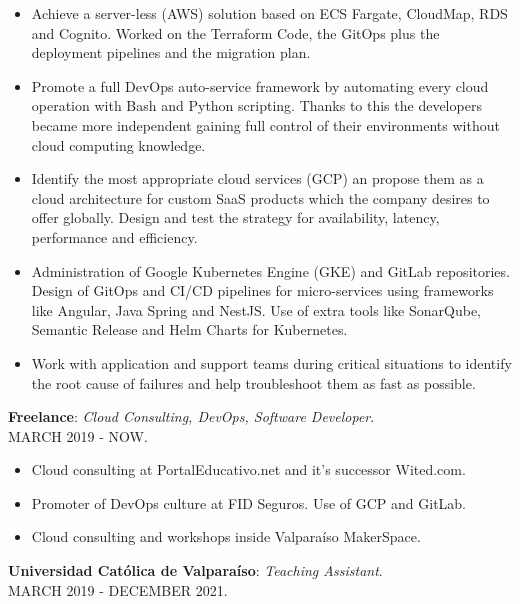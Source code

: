 \documentclass[11pt]{article}
\begin{document}
\begin{itemize}
    \item[1.] Achieve a server-less (AWS) solution based on ECS Fargate, CloudMap, RDS and Cognito. Worked on the Terraform Code, the GitOps plus the deployment pipelines and the migration plan.
    \item[2.] Promote a full DevOps auto-service framework by automating every cloud operation with Bash and Python scripting. Thanks to this the developers became more independent gaining full control of their environments without cloud computing knowledge.
    \item[3.] Identify the most appropriate cloud services (GCP) an propose them as a cloud architecture for custom SaaS products which the company desires to offer globally. Design and test the strategy for availability, latency, performance and efficiency.
    \item[4.] Administration of Google Kubernetes Engine (GKE) and GitLab repositories. Design of GitOps and CI/CD pipelines for micro-services using frameworks like Angular, Java Spring and NestJS. Use of extra tools like SonarQube, Semantic Release and Helm Charts for Kubernetes.
    \item[5.] Work with application and support teams during critical situations to identify the root cause of failures and help troubleshoot them as fast as possible.
\end{itemize}


\vspace{2mm}

\noindent
\textbf{Freelance}: \textit{Cloud Consulting, DevOps, Software Developer}.\\
{\footnotesize MARCH 2019 - NOW.}

\begin{itemize}
    \item[1.] Cloud consulting at PortalEducativo.net and it’s successor Wited.com.
    \item[2.] Promoter of DevOps culture at FID Seguros. Use of GCP and GitLab.
    \item[3.] Cloud consulting and workshops inside Valparaíso MakerSpace.
\end{itemize}


\vspace{2mm}

\noindent
\textbf{Universidad Católica de Valparaíso}: \textit{Teaching Assistant}.\\
{\footnotesize MARCH 2019 - DECEMBER 2021.}
\end{document}
